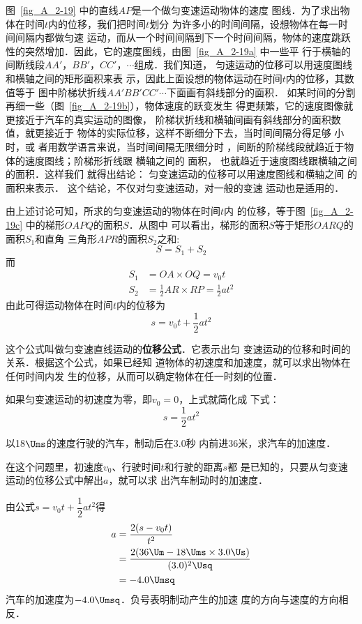     图~\ref{fig_A_2-19} 中的直线$AP$是一个做匀变速运动物体的速度
图线．为了求出物体在时间$t$内的位移，我们把时间$t$划分
为许多小的时间间隔，设想物体在每一时间间隔内都做匀速
运动，而从一个时间间隔到下一个时间间隔，物体的速度跳跃
性的突然增加．因此，它的速度图线，由图~\ref{fig_A_2-19a} 中一些平
行于横轴的间断线段$AA' $，$ BB' $，$ CC' $，$ \cdots$组成．我们知道，
匀速运动的位移可以用速度图线和横轴之间的矩形面积来表
示，因此上面设想的物体运动在时间$t$内的位移，其数值等于
图中阶梯状折线$AA'BB'CC'\cdots$下面画有斜线部分的面积．
如某时间的分割再细一些（图~\ref{fig_A_2-19b}），物体速度的跃变发生
得更频繁，它的速度图像就更接近于汽车的真实运动的图像，
阶梯状折线和横轴间画有斜线部分的面积数值，就更接近于
物体的实际位移，这样不断细分下去，当时间间隔分得足够
小时，或
者用数学语言来说，当时间间隔无限细分时
，间断的阶梯线段就趋近于物体的速度图线；阶梯形折线跟
横轴之间的
面积，
也就趋近于速度图线跟横轴之间的面积．这样我们
就得出结论：
匀变速运动的位移可以用速度图线和横轴之间
的面积来表示．
这个结论，不仅对匀变速运动，对一般的变速
运动也是适用的．

由上述讨论可知，所求的匀变速运动的物体在时间$t$内
的位移，等于图~\ref{fig_A_2-19c} 中的梯形$OAPQ$的面积$S$．从图中
可以看出，梯形的面积$S$等于矩形$OARQ$的面积$S_1$和直角
三角形$APR$的面积$S_2$之和:
\[S=S_1+S_2\]
而
 \[\begin{split}
S_1&=OA\times OQ=v_0 t\\
S_2&=\frac{1}{2}AR\times RP=\frac{1}{2}at^2
\end{split}\]
由此可得运动物体在时间$t$内的位移为
\[s=v_0t+\frac{1}{2}at^2 \]

    这个公式叫做匀变速直线运动的\textbf{位移公式}．它表示出匀
变速运动的位移和时间的关系．根据这个公式，如果已经知
道物体的初速度和加速度，就可以求出物体在任何时间内发
生的位移，从而可以确定物体在任一时刻的位置．

    如果匀变速运动的初速度为零，即$v_0=0$，上式就简化成
下式：
\[s=\frac{1}{2}at^2  \]

\begin{example}
以18$\Ums$的速度行驶的汽车，制动后在3.0秒
内前进36米，求汽车的加速度．
\end{example}

\begin{solution}
    在这个问题里，初速度$v_0$、行驶时间$t$和行驶的距离$s$都
是已知的，只要从匀变速运动的位移公式中解出$a$，就可以求
出汽车制动时的加速度．

由公式$s=v_0t+\dfrac{1}{2}at^2$得
\[\begin{split}
a&=\frac{2(s-v_0t)}{t^2}\\
&=\frac{2(36 \Um -18\Ums\times 3.0 \Us )}{(3.0)^2 \Usq}\\
&=-4.0\Umsq
\end{split} \]
    汽车的加速度为$-4.0\Umsq$．负号表明制动产生的加速
度的方向与速度的方向相反．

\end{solution}

